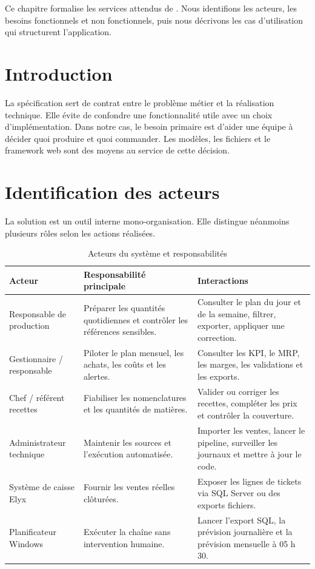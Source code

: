 
\begin{objectifbox}
Ce chapitre formalise les services attendus de \NomProjet. Nous identifions les
acteurs, les besoins fonctionnels et non fonctionnels, puis nous décrivons les cas
d'utilisation qui structurent l'application.
\end{objectifbox}

\section{Introduction}

La spécification sert de contrat entre le problème métier et la réalisation
technique. Elle évite de confondre une fonctionnalité utile avec un choix
d'implémentation. Dans notre cas, le besoin primaire est d'aider une équipe à
décider quoi produire et quoi commander. Les modèles, les fichiers et le framework
web sont des moyens au service de cette décision.

\section{Identification des acteurs}

La solution est un outil interne mono-organisation. Elle distingue néanmoins
plusieurs rôles selon les actions réalisées.

\begin{table}[H]
\centering
\caption{Acteurs du système et responsabilités}
\label{tab:acteurs}
\begin{tabularx}{\textwidth}{p{3.5cm}YY}
\toprule
\textbf{Acteur} & \textbf{Responsabilité principale} & \textbf{Interactions} \\
\midrule
Responsable de production & Préparer les quantités quotidiennes et contrôler les références sensibles. & Consulter le plan du jour et de la semaine, filtrer, exporter, appliquer une correction. \\
Gestionnaire / responsable & Piloter le plan mensuel, les achats, les coûts et les alertes. & Consulter les KPI, le MRP, les marges, les validations et les exports. \\
Chef / référent recettes & Fiabiliser les nomenclatures et les quantités de matières. & Valider ou corriger les recettes, compléter les prix et contrôler la couverture. \\
Administrateur technique & Maintenir les sources et l'exécution automatisée. & Importer les ventes, lancer le pipeline, surveiller les journaux et mettre à jour le code. \\
Système de caisse Elyx & Fournir les ventes réelles clôturées. & Exposer les lignes de tickets via SQL Server ou des exports fichiers. \\
Planificateur Windows & Exécuter la chaîne sans intervention humaine. & Lancer l'export SQL, la prévision journalière et la prévision mensuelle à 05 h 30. \\
\bottomrule
\end{tabularx}
\end{table}

